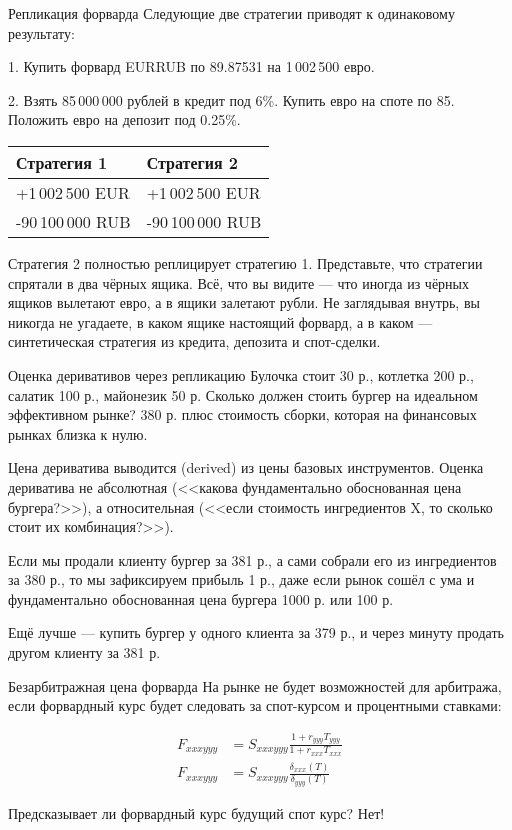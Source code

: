 \documentclass{beamer}
\begin{document}
\begin{frame}{Репликация форварда}
\justify
Следующие две стратегии приводят к одинаковому результату:

1. Купить форвард EURRUB по 89.87531 на 1\,002\,500 евро.

2. Взять 85\,000\,000 рублей в кредит под 6\%. Купить евро на споте по 85. Положить евро на депозит под 0.25\%.

\justify
\centering
\begin{tabular}{l|l}
Стратегия 1       & Стратегия 2 \\ \hline
+1\,002\,500 EUR  & +1\,002\,500 EUR \\
-90\,100\,000 RUB & -90\,100\,000 RUB
\end{tabular}

\justify
Стратегия 2 полностью \alert{реплицирует} стратегию 1. Представьте, что стратегии спрятали в два чёрных ящика. Всё, что вы видите --- что иногда из чёрных ящиков вылетают евро, а в ящики залетают рубли. Не заглядывая внутрь, вы никогда не угадаете, в каком ящике настоящий форвард, а в каком --- синтетическая стратегия из кредита, депозита и спот-сделки.
\end{frame}



\begin{frame}{Оценка деривативов через репликацию}
\justify
Булочка стоит 30 р., котлетка 200 р., салатик 100 р., майонезик 50 р. Сколько должен стоить бургер на идеальном эффективном рынке? 380 р. плюс стоимость сборки, которая на финансовых рынках близка к нулю.

\justify
Цена дериватива выводится (derived) из цены базовых инструментов. Оценка дериватива
не абсолютная (<<какова фундаментально обоснованная цена бургера?>>), а относительная (<<если стоимость ингредиентов X, то сколько стоит их комбинация?>>).

\justify
Если мы продали клиенту бургер за 381 р., а сами собрали его из ингредиентов за 380 р., то мы зафиксируем прибыль 1 р., даже если рынок сошёл с ума и фундаментально обоснованная цена бургера 1000 р. или 100 р.

\justify
Ещё лучше --- купить бургер у одного клиента за 379 р., и через минуту продать
другом клиенту за 381 р.
\end{frame}



\begin{frame}{Безарбитражная цена форварда}
\justify
На рынке не будет возможностей для арбитража, если форвардный курс будет следовать за спот-курсом и процентными ставками:

\begin{align*}
F_{xxxyyy} &= S_{xxxyyy} \frac{1 + r_{yyy}T_{yyy}}{1 + r_{xxx}T_{xxx}} \\
F_{xxxyyy} &= S_{xxxyyy} \frac{\delta_{xxx}(T)}{\delta_{yyy}(T)}
\end{align*}

\justify
Предсказывает ли форвардный курс будущий спот курс? Нет!
\end{frame}
\end{document}
